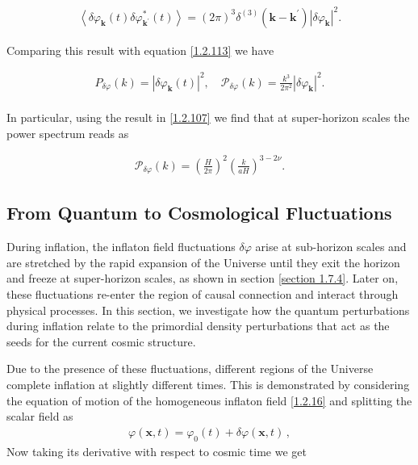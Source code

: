 \begin{align}
    \left\langle\delta \varphi_{\mathbf{k}}(t) \delta \varphi_{\mathbf{k}^{\prime}}^{*}(t)\right\rangle=(2 \pi)^{3} \delta^{(3)}\left(\mathbf{k}-\mathbf{k}^{\prime}\right)\left|\delta \varphi_{\mathbf{k}}\right|^{2} .\label{1.2.124}
\end{align}

Comparing this result with equation \eqref{1.2.113} we have 

\begin{align}
    P_{\delta \varphi}(k)=\left|\delta \varphi_{\mathbf{k}}(t)\right|^{2}, \quad \mathcal{P}_{\delta \varphi}(k)=\frac{k^{3}}{2 \pi^{2}}\left|\delta \varphi_{\mathbf{k}}\right|^{2} .\label{1.2.125}
\end{align}\\

In particular, using the result in \eqref{1.2.107} we find that at super-horizon scales the power spectrum reads as

\begin{align}
    \mathcal{P}_{\delta \varphi}(k)=\left(\frac{H}{2 \pi}\right)^{2}\left(\frac{k}{a H}\right)^{3-2 \nu} .\label{1.2.126}
\end{align}

\subsection{From Quantum to Cosmological Fluctuations}
During inflation, the inflaton field fluctuations $\delta \varphi$ arise at sub-horizon scales and are stretched by the rapid expansion of the Universe until they exit the horizon and freeze at super-horizon scales, as shown in section \eqref{section 1.7.4}. Later on, these fluctuations re-enter the region of causal connection and interact through physical processes. In this section, we investigate how the quantum perturbations during inflation relate to the primordial density perturbations that act as the seeds for the current cosmic structure.

Due to the presence of these fluctuations, different regions of the Universe complete inflation at slightly different times. This is demonstrated by considering the equation of motion of the homogeneous inflaton field \eqref{1.2.16} and splitting the scalar field as 
\begin{align}
    \varphi (\mathbf{x}, t) = \varphi_0 (t) + \delta \varphi (\mathbf{x}, t)
    \,, \label{1.2.127}
\end{align}
Now taking its derivative with respect to cosmic time we get

